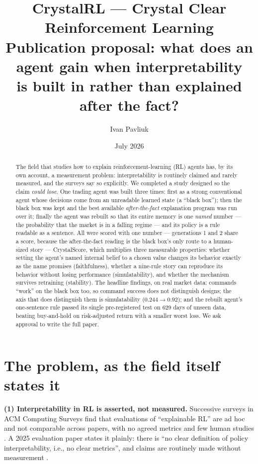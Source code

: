 \documentclass[11pt]{article}
\title{\vspace{-1.2em}CrystalRL --- Crystal Clear Reinforcement Learning\\
\large Publication proposal: what does an agent gain when interpretability\\
is built in rather than explained after the fact?}
\author{Ivan Pavliuk}
\date{July 2026}
\begin{document}
\maketitle
\vspace{-2em}

\begin{abstract}
\noindent The field that studies how to explain reinforcement-learning (RL) agents has, by its
own account, a measurement problem: interpretability is routinely claimed and rarely measured,
and the surveys say so explicitly. We completed a study designed so the claim \emph{could
lose}. One trading agent was built three times: first as a strong conventional agent whose
decisions come from an unreadable learned state (a ``black box''); then the black box was kept
and the best available \emph{after-the-fact} explanation program was run over it; finally the
agent was rebuilt so that its entire memory is one \emph{named} number --- the probability
that the market is in a falling regime --- and its policy is a rule readable as a sentence.
All were scored with one number --- generations 1 and 2 share a score, because the
after-the-fact reading is the black box's only route to a human-sized story --- CrystalScore, which multiplies three measurable
properties: whether setting the agent's named internal belief to a chosen value changes its behavior
exactly as the name promises (faithfulness), whether a nine-rule
story can reproduce its behavior without losing performance (simulatability), and whether the
mechanism survives retraining (stability). The headline findings, on real market data:
commands ``work'' on the black box too, so command success does not distinguish designs; the
axis that does distinguish them is simulatability ($0.244 \to 0.92$); and the rebuilt agent's
one-sentence rule passed its single pre-registered test on 629 days of unseen data, beating
buy-and-hold on risk-adjusted return with a smaller worst loss. We ask approval to write the
full paper.
\end{abstract}

\section{The problem, as the field itself states it}
\label{sec:ask}

\textbf{(1) Interpretability in RL is asserted, not measured.} Successive surveys in ACM
Computing Surveys find that evaluations of ``explainable RL'' are ad hoc and not comparable
across papers, with no agreed metrics and few human studies \citep{milani2024,vouros2023}. A
2025 evaluation paper states it plainly: there is ``no clear definition of policy
interpretability, i.e., no clear metrics'', and claims are routinely made without measurement
\citep{kohler2025}.
\end{document}
